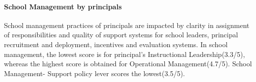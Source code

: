 \documentclass[twocolumn]{article}
\let\oldparagraph\paragraph
\renewcommand{\paragraph}[1]{\oldparagraph{#1}\mbox{}}
\begin{document}
\hypertarget{school-management-by-principals}{%
\paragraph{\texorpdfstring{\textbf{School Management by
principals}}{School Management by principals}}\label{school-management-by-principals}}

School management practices of principals are impacted by clarity in
assignment of responsibilities and quality of support systems for school
leaders, principal recruitment and deployment, incentives and evaluation
systems. In school management, the lowest score is for principal's
Instructional Leadership(3.3/5), whereas the highest score is obtained
for Operational Management(4.7/5). School Management- Support policy
lever scores the lowest(3.5/5).
\end{document}
